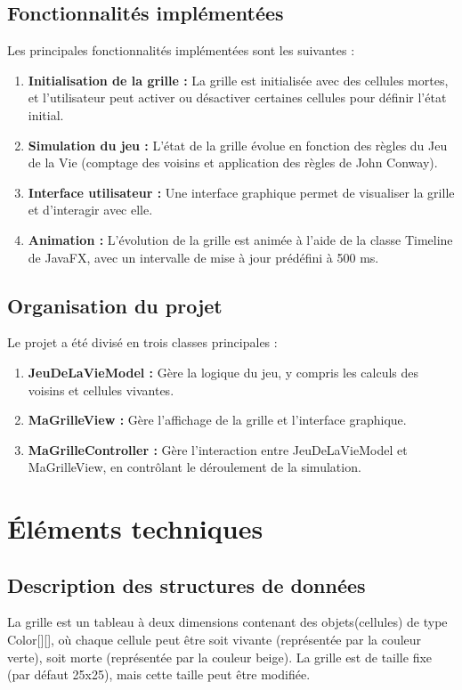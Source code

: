 \documentclass[a4paper,12pt]{article}
\begin{document}
\subsection{Fonctionnalités implémentées}
Les principales fonctionnalités implémentées sont les suivantes :
\begin{enumerate}
    \item \textbf{Initialisation de la grille :} 
    La grille est initialisée avec des cellules mortes, et l'utilisateur peut activer ou désactiver certaines cellules pour définir l'état initial.\\
    \item \textbf{Simulation du jeu :} 
   L'état de la grille évolue en fonction des règles du Jeu de la Vie (comptage des voisins et application des règles de 
 John Conway).\\
   \item \textbf{Interface utilisateur :} 
  Une interface graphique permet de visualiser la grille et d'interagir avec elle.\\
  \item \textbf{Animation :} 
  L'évolution de la grille est animée à l'aide de la classe Timeline de JavaFX, avec un intervalle de mise à jour prédéfini à 500 ms.
\end{enumerate}
\subsection{Organisation du projet}
Le projet a été divisé en trois classes principales :
\begin{enumerate}
    \item \textbf{JeuDeLaVieModel :} 
    Gère la logique du jeu, y compris les calculs des voisins et cellules vivantes.\\
    \item \textbf{MaGrilleView :} 
   Gère l'affichage de la grille et l'interface graphique.\\
   \item \textbf{MaGrilleController :} 
  Gère l'interaction entre JeuDeLaVieModel et MaGrilleView, en contrôlant le déroulement de la simulation.
\end{enumerate}
\section{Éléments techniques}
\subsection{Description des structures de données}
La grille est un tableau à deux dimensions contenant des objets(cellules) de type Color[][], où chaque cellule peut être soit vivante (représentée par la couleur verte), soit morte (représentée par la couleur beige). La grille est de taille fixe (par défaut 25x25), mais cette taille peut être modifiée.
\end{document}
